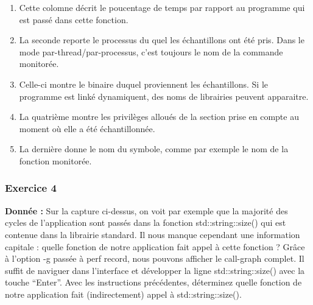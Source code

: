 \begin{enumerate}
\item Cette colomne décrit le poucentage de temps par rapport au programme qui est passé dans cette fonction.
\item La seconde reporte le processus du quel les échantillons ont été pris. Dans le mode par-thread/par-processus, c'est toujours le nom de la commande monitorée. 
\item Celle-ci montre le binaire duquel proviennent les échantillons. Si le programme est linké dynamiquent, des noms de librairies peuvent apparaitre.  
\item La quatrième montre les privilèges alloués de la section prise en compte au moment où elle a été échantillonnée.
\item La dernière donne le nom du symbole, comme par exemple le nom de la fonction monitorée.
\end{enumerate}

\subsubsection{Exercice 4}
\textbf{Donnée : } Sur	la	capture	ci-dessus,	on	voit	par	exemple	que	la	majorité	des	cycles	de	l'application	sont	passés	
dans	la	fonction	std::string::size() qui	est	contenue	dans	la	librairie	standard.	Il	nous	manque	
cependant	une	information	capitale :	quelle	fonction	de	notre	application	fait	appel	à	cette	fonction	?	
Grâce	à	l'option	-g passée	à	perf	record,	nous	pouvons	afficher	le	call-graph	complet.	Il	suffit	de	
naviguer	dans	l'interface	et	développer	la	ligne	std::string::size() avec	la	touche	“Enter”.	
Avec	les	instructions	précédentes,	déterminez quelle	fonction	de	notre	application	fait	(indirectement)	
appel	à	std::string::size().\\


